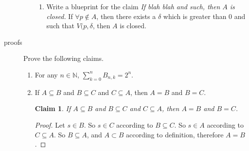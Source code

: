 \documentclass[11pt]{letter}
\newtheorem{claim}{Claim}
\theoremstyle{definition}
\begin{document}
\begin{description}
\begin{enumerate}
\begin{enumerate}
			\item Write a blueprint for the claim  {\em If blah blah and such, then $A$ is closed.}
If $\forall p\notin A$, then there exists a $\delta$ which is greater than 0 and such that $V(p,\delta$, then $A$ is closed.
			\end{enumerate}
\end{enumerate}\newpage

	\item[proofs] Prove the following claims. 
		\begin{enumerate}
			\item For any $n\in\mathbb{N}$, $\displaystyle\sum_{k=0}^n B_{n,k}=2^n$.
			\item If $A\subseteq B$ and $B\subseteq C$ and $C\subseteq A$, then $A=B$ and $B=C$.
\begin{claim}
If $A\subseteq B$ and $B\subseteq C$ and $C\subseteq A$, then $A=B$ and $B=C$.
\end{claim}
\begin{proof}
Let $s\in B$. So $s\in C$ according to $B\subseteq C$. So $s\in A$ according to $C\subseteq A$. So $B\subseteq A$, and $A\subset B$ according to definition, therefore $A=B$.


\end{proof}
\end{enumerate}
\end{description}
\end{document}
